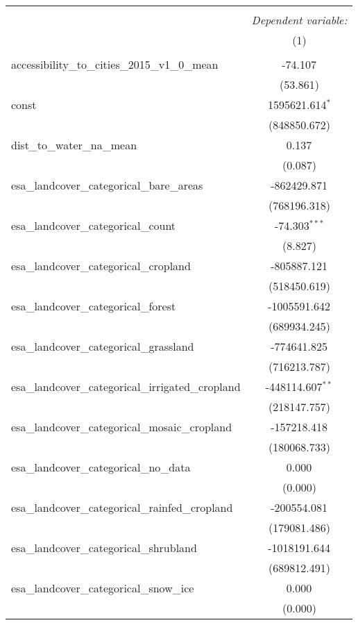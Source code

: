 \begin{table}[!htbp] \centering
\begin{tabular}{@{\extracolsep{5pt}}lc}
\\[-1.8ex]\hline
\hline \\[-1.8ex]
& \multicolumn{1}{c}{\textit{Dependent variable:}} \
\cr \cline{1-2}
\\[-1.8ex] & (1) \\
\hline \\[-1.8ex]
 accessibility_to_cities_2015_v1_0_mean & -74.107$^{}$ \\
  & (53.861) \\
 const & 1595621.614$^{*}$ \\
  & (848850.672) \\
 dist_to_water_na_mean & 0.137$^{}$ \\
  & (0.087) \\
 esa_landcover_categorical_bare_areas & -862429.871$^{}$ \\
  & (768196.318) \\
 esa_landcover_categorical_count & -74.303$^{***}$ \\
  & (8.827) \\
 esa_landcover_categorical_cropland & -805887.121$^{}$ \\
  & (518450.619) \\
 esa_landcover_categorical_forest & -1005591.642$^{}$ \\
  & (689934.245) \\
 esa_landcover_categorical_grassland & -774641.825$^{}$ \\
  & (716213.787) \\
 esa_landcover_categorical_irrigated_cropland & -448114.607$^{**}$ \\
  & (218147.757) \\
 esa_landcover_categorical_mosaic_cropland & -157218.418$^{}$ \\
  & (180068.733) \\
 esa_landcover_categorical_no_data & 0.000$^{}$ \\
  & (0.000) \\
 esa_landcover_categorical_rainfed_cropland & -200554.081$^{}$ \\
  & (179081.486) \\
 esa_landcover_categorical_shrubland & -1018191.644$^{}$ \\
  & (689812.491) \\
 esa_landcover_categorical_snow_ice & 0.000$^{}$ \\
  & (0.000) \\

\end{tabular}
\end{table}
